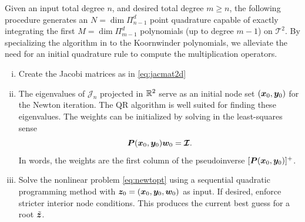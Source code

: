 Given an input total degree $n$, and desired total degree $m \geq n$, the following procedure generates an $N = \dim\Pi_{n-1}^d$ point quadrature capable of exactly integrating the first $M = \dim\Pi_{m-1}^d$ polynomials (up to degree $m-1$) on $\mathcal{T}^2$. By specializing the algorithm in \cite{vrquad} to the Koornwinder polynomials, we alleviate the need for an initial quadrature rule to compute the multiplication operators.
\noindent
\begin{enumerate}[(i)]
\item Create the Jacobi matrices as in \eqref{eq:jacmat2d}
\item The eigenvalues of $\mathcal{J}_n$ projected in $\mathbb{R}^2$ serve as an initial node set $(\boldsymbol{x}_0,\boldsymbol{y}_0)$ for the Newton iteration. The QR algorithm is well suited for finding these eigenvalues. The weights can be initialized by solving in the least-squares sense $$\boldsymbol{P}(\boldsymbol{x}_0,\boldsymbol{y}_0)\boldsymbol{w}_0 = \boldsymbol{\mathcal{I}}.$$
In words, the weights are the first column of the pseudoinverse $[\boldsymbol{P}(\boldsymbol{x}_0,\boldsymbol{y}_0)]^+$.
\item Solve the nonlinear problem \eqref{eq:newtopt} using a sequential quadratic programming method with $\boldsymbol{z}_0 = (\boldsymbol{x}_0,\boldsymbol{y}_0,\boldsymbol{w}_0)$ as input. If desired, enforce stricter interior node conditions. This produces the current best guess for a root $\tilde{\boldsymbol{z}}$. 

\end{enumerate}
